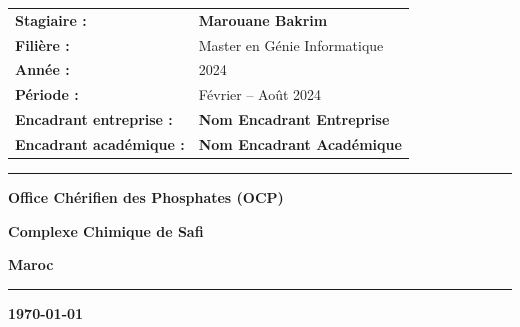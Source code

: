 \documentclass[12pt,a4paper]{report}
\newcommand{\etudiant}{Marouane Bakrim}
\newcommand{\filiere}{Master en Génie Informatique}
\newcommand{\annee}{2024}
\newcommand{\encadrantE}{Nom Encadrant Entreprise}
\newcommand{\encadrantA}{Nom Encadrant Académique}
\newcommand{\duree}{Février -- Août 2024}
\begin{document}
\begin{titlepage}
\begin{center}
\begin{minipage}{0.8\textwidth}
\begin{center}
\begin{tabular}{ll}
\textbf{\large Stagiaire :} & \large \textbf{\etudiant} \\
\textbf{\large Filière :} & \large \filiere \\
\textbf{\large Année :} & \large \annee \\
\textbf{\large Période :} & \large \duree \\
\textbf{\large Encadrant entreprise :} & \large \textbf{\encadrantE} \\
\textbf{\large Encadrant académique :} & \large \textbf{\encadrantA} \\
\end{tabular}
\end{center}
\end{minipage}
\end{center}

\vspace{1cm}

\begin{center}
\begin{minipage}{0.7\textwidth}
\centering
\fboxsep=8pt\fboxrule=1pt
\end{minipage}
\end{center}

\vspace{0.5cm}

\begin{center}
\begin{minipage}{0.8\textwidth}
\centering
\rule{0.6\textwidth}{1pt}
\vspace{0.3cm}
{\large \textbf{\textcolor{blue!70!black}{Office Chérifien des Phosphates (OCP)}}\par}
{\large \textbf{Complexe Chimique de Safi}\par}
{\large \textbf{Maroc}\par}
\vspace{0.3cm}
\rule{0.6\textwidth}{1pt}
\end{minipage}
\end{center}

\vspace{0.5cm}

\begin{center}
{\large \textbf{\today}}
\end{center}

\end{titlepage}
\end{document}
